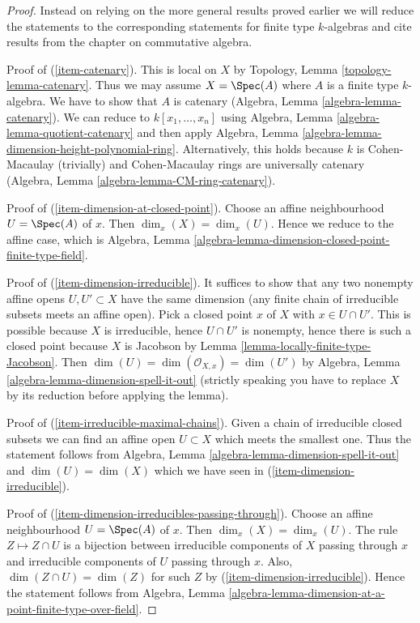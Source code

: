 \begin{proof}
Instead on relying on the more general results proved earlier
we will reduce the statements to the corresponding statements
for finite type $k$-algebras and cite results from the chapter
on commutative algebra.

\medskip\noindent
Proof of (\ref{item-catenary}). This is local on $X$ by
Topology, Lemma \ref{topology-lemma-catenary}. Thus we may
assume $X = \Spec(A)$ where $A$ is a finite type $k$-algebra.
We have to show that $A$ is catenary
(Algebra, Lemma \ref{algebra-lemma-catenary}).
We can reduce to $k[x_1, \ldots, x_n]$ using
Algebra, Lemma \ref{algebra-lemma-quotient-catenary} and then apply
Algebra, Lemma \ref{algebra-lemma-dimension-height-polynomial-ring}.
Alternatively, this holds because $k$ is Cohen-Macaulay (trivially) and
Cohen-Macaulay rings are universally catenary
(Algebra, Lemma \ref{algebra-lemma-CM-ring-catenary}).

\medskip\noindent
Proof of (\ref{item-dimension-at-closed-point}). Choose an affine
neighbourhood $U = \Spec(A)$ of $x$. Then $\dim_x(X) = \dim_x(U)$.
Hence we reduce to the affine case, which is
Algebra, Lemma \ref{algebra-lemma-dimension-closed-point-finite-type-field}.

\medskip\noindent
Proof of (\ref{item-dimension-irreducible}). It suffices to show that
any two nonempty affine opens $U, U' \subset X$ have the same dimension
(any finite chain of irreducible subsets meets an affine open).
Pick a closed point $x$ of $X$ with $x \in U \cap U'$. This is possible
because $X$ is irreducible, hence $U \cap U'$ is nonempty, hence there is
such a closed point because $X$ is Jacobson by
Lemma \ref{lemma-locally-finite-type-Jacobson}. Then
$\dim(U) = \dim(\mathcal{O}_{X, x}) = \dim(U')$ by
Algebra, Lemma \ref{algebra-lemma-dimension-spell-it-out}
(strictly speaking you have to replace $X$ by its reduction before
applying the lemma).

\medskip\noindent
Proof of (\ref{item-irreducible-maximal-chains}). Given a chain
of irreducible closed subsets we can find an affine open $U \subset X$
which meets the smallest one. Thus the statement follows from
Algebra, Lemma \ref{algebra-lemma-dimension-spell-it-out} 
and $\dim(U) = \dim(X)$ which we have seen in
(\ref{item-dimension-irreducible}).

\medskip\noindent
Proof of (\ref{item-dimension-irreducibles-passing-through}).
Choose an affine neighbourhood $U = \Spec(A)$ of $x$. Then
$\dim_x(X) = \dim_x(U)$. The rule $Z \mapsto Z \cap U$
is a bijection between irreducible components of $X$ passing through
$x$ and irreducible components of $U$ passing through $x$.
Also, $\dim(Z \cap U) = \dim(Z)$ for such $Z$ by
(\ref{item-dimension-irreducible}).
Hence the statement follows from
Algebra, Lemma \ref{algebra-lemma-dimension-at-a-point-finite-type-over-field}.


\end{proof}
